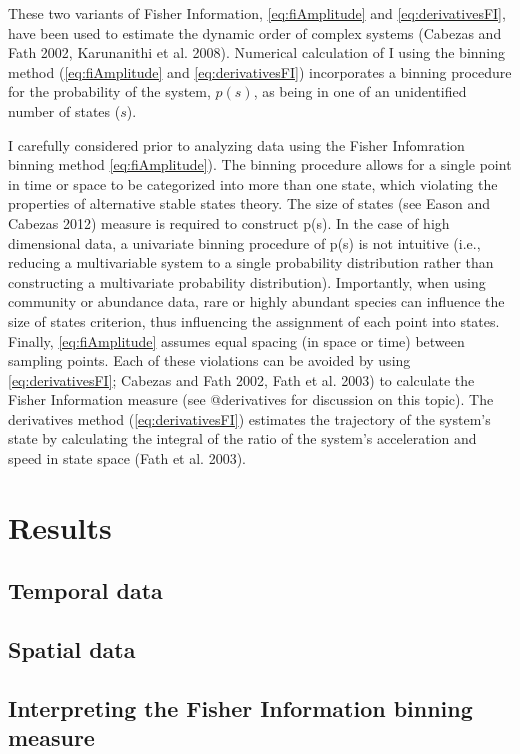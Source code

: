 \documentclass[12pt,twoside,openany]{reedthesis}
\begin{document}
These two variants of Fisher Information, \eqref{eq:fiAmplitude} and
\eqref{eq:derivativesFI}, have been used to estimate the dynamic order of
complex systems (Cabezas and Fath 2002, Karunanithi et al. 2008).
Numerical calculation of I using the binning method
(\eqref{eq:fiAmplitude} and \eqref{eq:derivativesFI}) incorporates a binning
procedure for the probability of the system, \(p(s)\), as being in one
of an unidentified number of states (\(s\)).

I carefully considered prior to analyzing data using the Fisher
Infomration binning method \eqref{eq:fiAmplitude}). The binning procedure
allows for a single point in time or space to be categorized into more
than one state, which violating the properties of alternative stable
states theory. The size of states (see Eason and Cabezas 2012) measure
is required to construct p(s). In the case of high dimensional data, a
univariate binning procedure of p(s) is not intuitive (i.e., reducing a
multivariable system to a single probability distribution rather than
constructing a multivariate probability distribution). Importantly, when
using community or abundance data, rare or highly abundant species can
influence the size of states criterion, thus influencing the assignment
of each point into states. Finally, \eqref{eq:fiAmplitude} assumes equal
spacing (in space or time) between sampling points. Each of these
violations can be avoided by using \eqref{eq:derivativesFI}; Cabezas and
Fath 2002, Fath et al. 2003) to calculate the Fisher Information measure
(see @derivatives for discussion on this topic). The derivatives method
(\eqref{eq:derivativesFI}) estimates the trajectory of the system's state
by calculating the integral of the ratio of the system's acceleration
and speed in state space (Fath et al. 2003).

\section{Results}\label{results-1}

\subsection{Temporal data}\label{temporal-data}

\subsection{Spatial data}\label{spatial-data}

\subsection{Interpreting the Fisher Information binning
measure}\label{interpreting-the-fisher-information-binning-measure}
\end{document}
